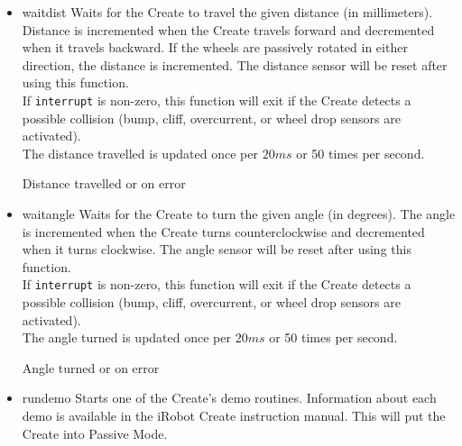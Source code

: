 \documentclass {article}
\begin{document}
\begin {itemize}
  \item {} {waitdist}
         Waits for the Create to travel the given distance (in millimeters).  Distance is
         incremented when the Create travels forward and decremented when it travels backward.  If
         the wheels are passively rotated in either direction, the distance is incremented.  The
         distance sensor will be reset after using this function. \\
         If {\tt interrupt} is non-zero, this function will exit if the Create detects a possible
         collision (bump, cliff, overcurrent, or wheel drop sensors are activated). \\
         The distance travelled is updated once per $20ms$ or 50 times per second. \\
         \ret Distance travelled or \fail on error

  \item {} {waitangle}
         Waits for the Create to turn the given angle (in degrees).  The angle is incremented when
         the Create turns counterclockwise and decremented when it turns clockwise.  The angle
         sensor will be reset after using this function.  \\
         If {\tt interrupt} is non-zero, this function will exit if the Create detects a possible
         collision (bump, cliff, overcurrent, or wheel drop sensors are activated). \\
         The angle turned is updated once per $20ms$ or 50 times per second. \\
         \ret Angle turned or \fail on error
        
  \item {} {rundemo}
        Starts one of the Create's demo routines.  Information about each demo is available in the
        iRobot Create instruction manual.  This will put the Create into Passive Mode. \\
        \retnorm


\end{itemize}
\end{document}
